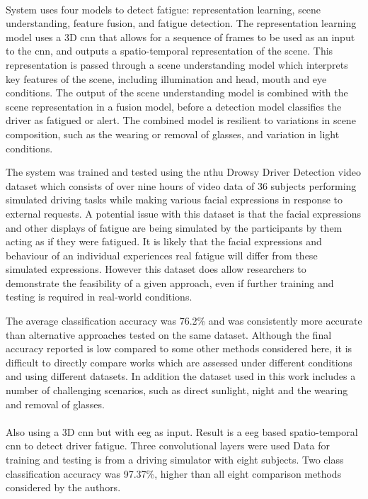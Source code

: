 \documentclass[11pt, parskip=half*,twoside=false]{scrbook}
\begin{document}
\paragraph{\citet{yuDriverDrowsinessDetection2019}} System uses four models to detect fatigue: representation learning, scene understanding, feature fusion, and fatigue detection. The representation learning model uses a 3D \gls{cnn} that allows for a sequence of frames to be used as an input to the \gls{cnn}, and outputs a spatio-temporal representation of the scene. This representation is passed through a scene understanding model which interprets key features of the scene, including illumination and head, mouth and eye conditions. The output of the scene understanding model is combined with the scene representation in a fusion model, before a detection model classifies the driver as fatigued or alert. The combined model is resilient to variations in scene composition, such as the wearing or removal of glasses, and variation in light conditions. 
 
The system was trained and tested using the \gls{nthu} Drowsy Driver Detection video dataset \citep{wengDriverDrowsinessDetection2017} which consists of over nine hours of video data of 36 subjects performing simulated driving tasks while making various facial expressions in response to external requests. A potential issue with this dataset is that the facial expressions and other displays of fatigue are being simulated by the participants by them acting as if they were fatigued. It is likely that the facial expressions and behaviour of an individual experiences real fatigue will differ from these simulated expressions. However this dataset does allow researchers to demonstrate the feasibility of a given approach, even if further training and testing is required in real-world conditions.

The average classification accuracy was 76.2\% and was consistently more accurate than alternative approaches tested on the same dataset. Although the final accuracy reported is low compared to some other methods considered here, it is difficult to directly compare works which are assessed under different conditions and using different datasets. In addition the dataset used in this work includes a number of challenging scenarios, such as direct sunlight, night and the wearing and removal of glasses.

\paragraph{\citet{gaoEEGBasedSpatioTemporal2019}} Also using a 3D \gls{cnn} but with \gls{eeg} as input. Result is a \gls{eeg} based spatio-temporal \gls{cnn} to detect driver fatigue. Three convolutional layers were used Data for training and testing is from a driving simulator with eight subjects. Two class classification accuracy was 97.37\%, higher than all eight comparison methods considered by the authors.
\end{document}
